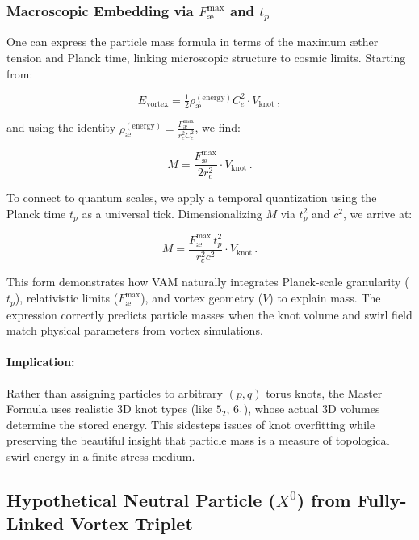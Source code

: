 \documentclass[a4paper,12pt]{article}
\begin{document}
\subsubsection*{Macroscopic Embedding via $F_{\text{\ae}}^{\max}$ and $t_p$}

One can express the particle mass formula in terms of the maximum æther tension and Planck time, linking microscopic structure to cosmic limits. Starting from:

\[
    E_{\text{vortex}} = \tfrac{1}{2} \rho_{\text{\ae}}^{(\text{energy})} C_e^2 \cdot V_{\text{knot}} \,,
\]

and using the identity $\rho_{\text{\ae}}^{(\text{energy})} = \frac{F_{\text{\ae}}^{\max}}{r_c^2 C_e^2}$, we find:

\begin{equation}
    M = \frac{F_{\text{\ae}}^{\max}}{2 r_c^2} \cdot V_{\text{knot}} \,.
\end{equation}

To connect to quantum scales, we apply a temporal quantization using the Planck time $t_p$ as a universal tick. Dimensionalizing $M$ via $t_p^2$ and $c^2$, we arrive at:

\begin{equation}
    M = \frac{F_{\text{\ae}}^{\max} \, t_p^2}{r_c^2 c^2} \cdot V_{\text{knot}} \,.
\end{equation}

This form demonstrates how VAM naturally integrates Planck-scale granularity ($t_p$), relativistic limits ($F_{\text{\ae}}^{\max}$), and vortex geometry ($V$) to explain mass. The expression correctly predicts particle masses when the knot volume and swirl field match physical parameters from vortex simulations.

\paragraph{Implication:} Rather than assigning particles to arbitrary $(p,q)$ torus knots, the Master Formula uses realistic 3D knot types (like $5_2$, $6_1$), whose actual 3D volumes determine the stored energy. This sidesteps issues of knot overfitting while preserving the beautiful insight that particle mass is a measure of topological swirl energy in a finite-stress medium.

\subsection{Hypothetical Neutral Particle \texorpdfstring{($X^0$)}{(X⁰)} from Fully-Linked Vortex Triplet}
\end{document}
